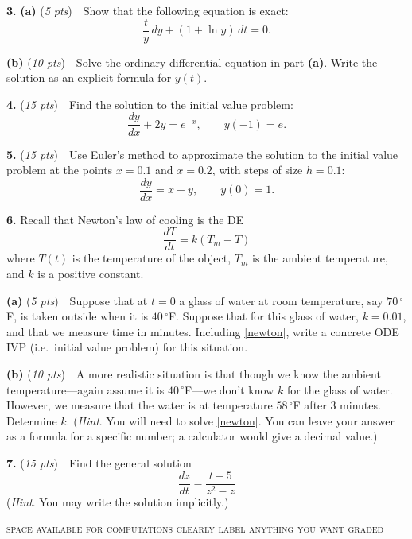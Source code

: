 \documentclass[11pt,reqno]{amsart}
\newcommand{\dydx}{\frac{dy}{dx}}
\newcommand{\prob}[1]{\bigskip\noindent\textbf{#1.} }
\newcommand{\pts}[1]{(\emph{#1 pts})}
\newcommand{\probpts}[2]{\prob{#1} \pts{#2} \,\,}
\newcommand{\ppartpts}[2]{\textbf{(#1)} \pts{#2} \,\,}
\newcommand{\epartpts}[2]{\medskip\noindent \textbf{(#1)} \pts{#2} \,\,}
\begin{document}
\newpage
\prob{3} \ppartpts{a}{5}  Show that the following equation is exact:
	$$\frac{t}{y}\,dy + (1+\ln y)\,dt = 0.$$
\vfill

\epartpts{b}{10}  Solve the ordinary differential equation in part \textbf{(a)}.  Write the solution as an explicit formula for $y(t)$.
\vfill

\newpage
\probpts{4}{15}  Find the solution to the initial value problem:
	$$\dydx + 2y = e^{-x}, \qquad y(-1)=e.$$
\vfill

\probpts{5}{15}  Use Euler's method to approximate the solution to the initial value problem at the points $x=0.1$ and $x=0.2$, with steps of size $h=0.1$:
	$$\dydx = x+ y, \qquad y(0)=1.$$
\vfill

\newpage
\prob{6}  Recall that Newton's law of cooling is the DE
\begin{equation}
    \frac{dT}{dt} = k (T_m - T) \label{newton}
\end{equation}
where $T(t)$ is the temperature of the object, $T_m$ is the ambient temperature, and $k$ is a positive constant.

\epartpts{a}{5}  Suppose that at $t=0$ a glass of water at room temperature, say $70\,{}^\circ$F, is taken outside when it is $40\,{}^\circ$F.  Suppose that for this glass of water, $k=0.01$, and that we measure time in minutes.  Including \eqref{newton}, write a concrete ODE IVP (i.e.~initial value problem) for this situation.
\vspace{50mm}

\epartpts{b}{10}  A more realistic situation is that though we know the ambient temperature---again assume it is $40\,{}^\circ$F---we don't know $k$ for the glass of water.  However, we measure that the water is at temperature $58\,{}^\circ$F after $3$ minutes.  Determine $k$.  (\emph{Hint}.  You will need to solve \eqref{newton}.  You can leave your answer as a formula for a specific number; a calculator would give a decimal value.)
\vfill

\newpage
\probpts{7}{15}  Find the general solution
	$$\frac{dz}{dt} = \frac{t-5}{z^2-z}$$
(\emph{Hint}.  You may write the solution implicitly.)
\vfill

\noindent \hrulefill

\scriptsize \centerline{ \textsc{space available for computations \hspace{30mm} clearly label anything you want graded}}
\vspace{2.0in}
\end{document}
